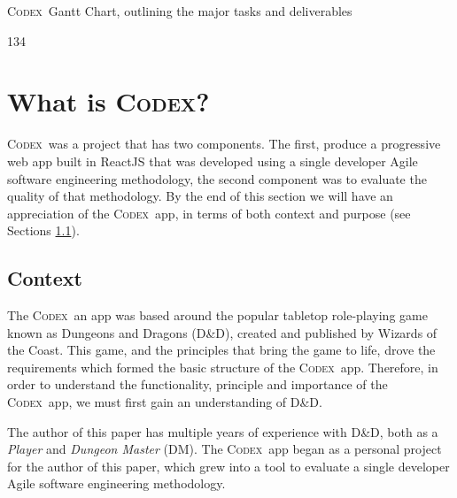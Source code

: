 \documentclass[final]{cmpreport}
\newcommand{\WotC}{Wizards of the Coast}
\newcommand{\dnd}{D\&D}
\newcommand{\Codex}{\textsc{Codex}}
\begin{document}
\begin{cmpfigure}{\Codex \ Gantt Chart, outlining the major tasks and deliverables\label{gantt:pplan}}
\begin{sideways}
\begin{ganttchart}[y unit chart = 0.75cm, y unit title = 0.75cm, x unit=0.45cm, vgrid, title label font=\scriptsize,
				canvas/.style={draw=black, dotted}]{1}{34}
				  
				  
				  
				  
				 
			\end{ganttchart}
		\end{sideways}
	\end{cmpfigure}		
	\section{What is \Codex?} \label{sec:what-codex}
	\Codex \ was a project that has two components. The first, produce a progressive web app built in ReactJS that was developed using a single developer Agile software engineering methodology, the second component was to evaluate the quality of that methodology. By the end of this section we will have an appreciation of the \Codex \ app, in terms of both context and purpose (see Sections \ref{sec:context}).
	
		\subsection{Context} \label{sec:context}
		The \Codex \ an app was based around the popular tabletop role-playing game known as Dungeons and Dragons (\dnd), created and published by \WotC. This game, and the principles that bring the game to life, drove the requirements which formed the basic structure of the \Codex \ app. Therefore, in order to understand the functionality, principle and importance of the \Codex \ app, we must first gain an understanding of \dnd. 
		
		The author of this paper has multiple years of experience with \dnd, both as a \emph{Player} and \emph{Dungeon Master} (DM). The \Codex \ app began as a personal project for the author of this paper, which grew into a tool to evaluate a single developer Agile software engineering methodology. 
		
\end{document}
